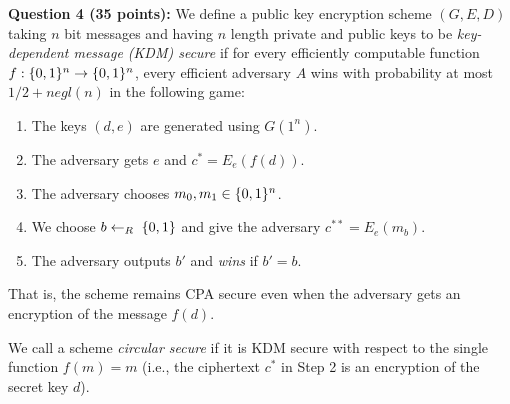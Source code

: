 \documentclass{article}
\begin{document}
\noindent{}\textbf{Question 4 (35 points):} We define a public key encryption scheme $(G,E,D)$ taking $n$ bit messages and having $n$ length private and public keys  to be \emph{key-dependent message (KDM) secure} if for every efficiently computable function $f:\{0,1\}^n\rightarrow\{0,1\}^n$, every efficient adversary $A$ wins with probability at most $1/2+ negl(n)$ in the following game:%

\begin{enumerate}[noitemsep,topsep=\mdcompacttopsep]%

\item{}The keys $(d,e)$ are generated using $G(1^n)$.%

\item{}The adversary gets $e$ and $c^* = E_e(f(d))$.%

\item{}The adversary chooses $m_0,m_1 \in \{0,1\}^n$.%

\item{}We choose $b\leftarrow_R\;\{0,1\}$ and give the adversary $c^{**}=E_e(m_b)$.%

\item{}The adversary outputs $b'$ and \emph{wins} if $b'=b$.%
\end{enumerate}%

\noindent{}That is, the scheme remains CPA secure even when the adversary gets an encryption of the message $f(d)$.%

We call a scheme \emph{circular secure} if it is KDM secure with respect to the single function $f(m)=m$ (i.e., the ciphertext $c^*$ in Step 2 is an encryption of the secret key $d$).%
\end{document}
